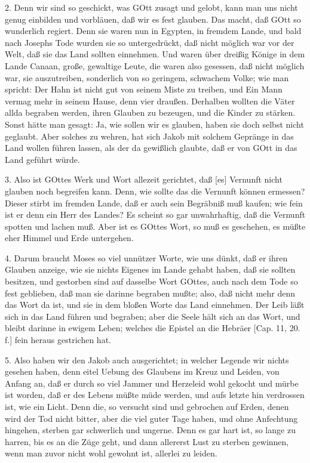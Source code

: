2. Denn wir sind so geschickt, was GOtt zusagt und gelobt, kann man uns nicht genug einbilden und vorbläuen, daß wir es fest glauben. Das macht, daß GOtt so wunderlich regiert. Denn sie waren nun in Egypten, in fremdem Lande, und bald nach Josephs Tode wurden sie so untergedrückt, daß nicht möglich war vor der Welt, daß sie das Land sollten einnehmen. Und waren über dreißig Könige in dem Lande Canaan, große, gewaltige Leute, die waren also gesessen, daß nicht möglich war, sie auszutreiben, sonderlich von so geringem, schwachem Volke; wie man spricht: Der Hahn ist nicht gut von seinem Miste zu treiben, und Ein Mann vermag mehr in seinem Hause, denn vier draußen. Derhalben wollten die Väter allda begraben werden, ihren Glauben zu bezeugen, und die Kinder zu stärken. Sonst hätte man gesagt: Ja, wie sollen wir es glauben, haben sie doch selbst nicht geglaubt. Aber solches zu wehren, hat sich Jakob mit solchem Gepränge in das Land wollen führen lassen, als der da gewißlich glaubte, daß er von GOtt in das Land geführt würde.

3. Also ist GOttes Werk und Wort allezeit gerichtet, daß [es] Vernunft nicht glauben noch begreifen kann. Denn, wie sollte das die Vernunft können ermessen? Dieser stirbt im fremden Lande, daß er auch sein Begräbniß muß kaufen; wie fein ist er denn ein Herr des Landes? Es scheint so gar unwahrhaftig, daß die Vernunft spotten und lachen muß. Aber ist es GOttes Wort, so muß es geschehen, es müßte eher Himmel und Erde untergehen.

4. Darum braucht Moses so viel unnützer Worte, wie uns dünkt, daß er ihren Glauben
anzeige, wie sie nichts Eigenes im Lande gehabt haben, daß sie sollten besitzen, und gestorben sind auf dasselbe Wort GOttes, auch nach dem Tode so fest geblieben, daß man sie darinne begraben mußte; also, daß nicht mehr denn das Wort da ist, und sie in dem bloßen Worte das Land einnehmen. Der Leib läßt sich in das Land führen und begraben; aber die Seele hält sich an das Wort, und bleibt darinne in ewigem Leben; welches die Epistel an die Hebräer [Cap. 11, 20. f.] fein heraus gestrichen hat.

5. Also haben wir den Jakob auch ausgerichtet; in welcher Legende wir nichts gesehen haben, denn eitel Uebung des Glaubens im Kreuz und Leiden, von Anfang an, daß er durch so viel Jammer und Herzeleid wohl gekocht und mürbe ist worden, daß er des Lebens müßte müde werden, und aufs letzte hin verdrossen ist, wie ein Licht. Denn die, so versucht sind und gebrochen auf Erden, denen wird der Tod nicht bitter, aber die viel guter Tage haben, und ohne Anfechtung hingehen, sterben gar schwerlich und ungerne. Denn es gar hart ist, so lange zu harren, bis es an die Züge geht, und dann allererst Lust zu sterben gewinnen, wenn man zuvor nicht wohl gewohnt ist, allerlei zu leiden.

